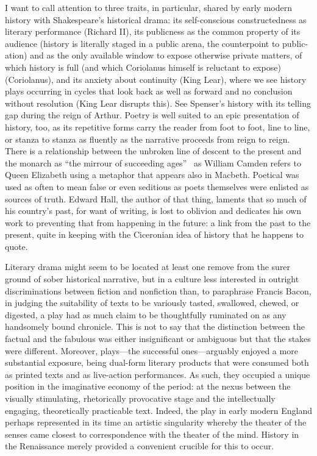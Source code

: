 I want to call attention to three traits, in particular, shared by early modern history with Shakespeare's historical drama: its self-conscious constructedness as literary performance (Richard II), its publicness as the common property of its audience (history is literally staged in a public arena, the counterpoint to public-ation) and as the only available window to expose otherwise private matters, of which history is full (and which Coriolanus himself is reluctant to expose) (Coriolanus), and its anxiety about continuity (King Lear), where we see history plays occurring in cycles that look back as well as forward and no conclusion without resolution (King Lear disrupts this). See Spenser's history with its telling gap during the reign of Arthur. Poetry is well suited to an epic presentation of history, too, as its repetitive forms carry the reader from foot to foot, line to line, or stanza to stanza as fluently as the narrative proceeds from reign to reign. There is a relationship between the unbroken line of descent to the present and the monarch as ``the mirrour of succeeding ages''~\cite[3]{camden_remaines_1605} as William Camden refers to Queen Elizabeth using a metaphor that appears also in Macbeth. Poetical was used as often to mean false or even seditious as poets themselves were enlisted as sources of truth. Edward Hall, the author of that thing, laments that so much of his country's past, for want of writing, is lost to oblivion and dedicates his own work to preventing that from happening in the future: a link from the past to the present, quite in keeping with the Ciceronian idea of history that he happens to quote. 

Literary drama might seem to be located at least one remove from the surer ground of sober historical narrative, but in a culture less interested in outright discriminations between fiction and nonfiction than, to paraphrase Francis Bacon, in judging the suitability of texts to be variously tasted, swallowed, chewed, or digested, a play had as much claim to be thoughtfully ruminated on as any handsomely bound chronicle. This is not to say that the distinction between the factual and the fabulous was either insignificant or ambiguous but that the stakes were different. Moreover, plays---the successful ones---arguably enjoyed a more substantial exposure, being dual-form literary products that were consumed both as printed texts and as live-action performances. As such, they occupied a unique position in the imaginative economy of the period: at the nexus between the visually stimulating, rhetorically provocative stage and the intellectually engaging, theoretically practicable text. Indeed, the play in early modern England perhaps represented in its time an artistic singularity whereby the theater of the senses came closest to correspondence with the theater of the mind. History in the Renaissance merely provided a convenient crucible for this to occur.

